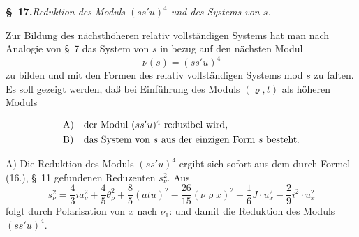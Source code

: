 \begin{center}
\textbf{\S\ 17.}\quad\emph{Reduktion des Moduls $(ss'u)^4$ und des Systems von $s$.}
\end{center}

Zur Bildung des nächsthöheren relativ vollständigen Systems hat man nach Analogie von \S\ 7 das System von $s$ in bezug auf den nächsten Modul
\[
\nu(s)=(ss'u)^4
\]
zu bilden und mit den Formen des relativ vollständigen Systems mod $s$ zu falten. Es soll gezeigt werden, daß bei Einführung des Moduls $(\varrho,t)$ als höheren Moduls
\[
\begin{array}{ll}
\text{A)}&\text{der Modul }(ss'u)^4\text{ reduzibel wird,}\vphantom{\dfrac11}\\
\text{B)}&\text{das System von }s\text{ aus der einzigen Form }s\text{ besteht.}
\end{array}
\]

A) Die Reduktion des Moduls $(ss'u)^4$ ergibt sich sofort aus dem durch Formel (16.), \S\ 11 gefundenen Reduzenten $s_\nu^2$. Aus
\[
 s_\nu^2=\frac43 i a_\nu^2+\frac45\theta_\varrho^2+\frac85(atu)^2-
 \frac{26}{15}(\nu\varrho x)^2+\frac16J\cdot u_x^2-
 \frac29i^2\cdot u_x^2
\]
folgt durch Polarisation von $x$ nach $\nu_1$:
und damit die Reduktion des Moduls $(ss'u)^4$.



